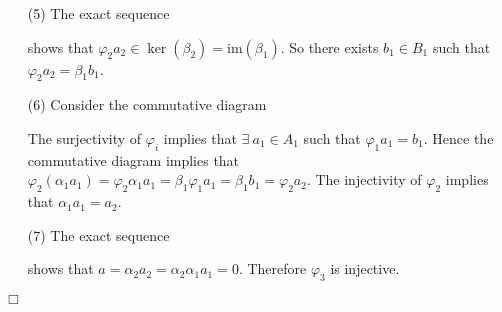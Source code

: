 \documentclass{article}
\begin{document}
\begin{enumerate}
\item[(5)]
  The exact sequence
  \begin{center}
  \end{center}
  shows that $\varphi_2 a_2 \in \ker(\beta_2) = \mathrm{im}(\beta_1)$.
  So there exists $b_1 \in B_1$ such that $\varphi_2 a_2 = \beta_1 b_1$.

\item[(6)]
  Consider the commutative diagram
  \begin{center}
  \end{center}
  The surjectivity of $\varphi_i$ implies that
  $\exists \: a_1 \in A_1$ such that $\varphi_1 a_1 = b_1$.
  Hence the commutative diagram implies that
  $\varphi_2(\alpha_1 a_1) = \varphi_2\alpha_1 a_1 = \beta_1 \varphi_1 a_1 = \beta_1 b_1 = \varphi_2 a_2$.
  The injectivity of $\varphi_2$ implies that $\alpha_1 a_1 = a_2$.

\item[(7)]
  The exact sequence
  \begin{center}
  \end{center}
  shows that $a = \alpha_2 a_2 = \alpha_2 \alpha_1 a_1 = 0$.
  Therefore $\varphi_3$ is injective.
\end{enumerate}
$\Box$ \\
\end{document}
